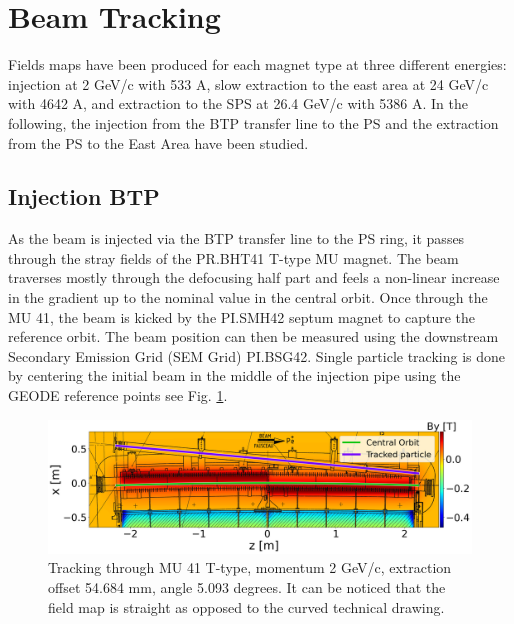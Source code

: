 \documentclass[a4paper,
               biblatex,     %
               keeplastbox,   %
               ]{jacow}
\begin{document}
\section{Beam Tracking}
Fields maps have been produced for each magnet type at three different energies: injection at 2 GeV/c with 533 A, slow extraction to the east area at 24 GeV/c with 4642 A, and extraction to the SPS at 26.4 GeV/c with 5386 A. In the following, the injection from the BTP transfer line to the PS and the extraction from the PS to the East Area have been studied.

\subsection{Injection BTP}
As the beam is injected via the BTP transfer line to the PS ring, it passes through the stray fields of the PR.BHT41 T-type MU magnet. The beam traverses mostly through the defocusing half part and feels a non-linear increase in the gradient up to the nominal value in the central orbit. Once through the MU 41, the beam is kicked by the PI.SMH42 septum magnet to capture the reference orbit. The beam position can then be measured using the downstream Secondary Emission Grid (SEM Grid) PI.BSG42. Single particle tracking is done by centering the initial beam in the middle of the injection pipe using the GEODE reference points see Fig. \ref{fig:injection_btp}.

\begin{figure}[!htb]
   \centering
   \includegraphics*[width=1.0\columnwidth]{MOPOTK030_f5.png}
   \caption{Tracking through MU 41 T-type, momentum 2 GeV/c, extraction offset 54.684 mm, angle 5.093 degrees. It can be noticed that the field map is straight as opposed to the curved technical drawing.}
   \label{fig:injection_btp}
\end{figure}
\end{document}
